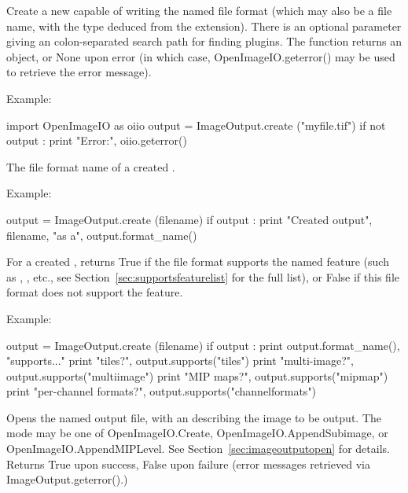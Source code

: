 
Create a new \ImageOutput capable of writing the named file format (which may
also be a file name, with the type deduced from the extension).  There
is an optional parameter giving an colon-separated search path for finding
\ImageOutput plugins.  The function returns an \ImageOutput object, or
{\cf None} upon error (in which case, {OpenImageIO.geterror()} may be used
to retrieve the error message).

\noindent Example:
\begin{code}
    import OpenImageIO as oiio
    output = ImageOutput.create ("myfile.tif")
    if not output :
        print "Error:", oiio.geterror()
\end{code}
\apiend

The file format name of a created \ImageOutput.

\noindent Example:
\begin{code}
    output = ImageOutput.create (filename)
    if output :
        print "Created output", filename, "as a", output.format_name()
\end{code}
\apiend

For a created \ImageOutput, returns {\cf True} if the file format supports
the named feature (such as , , etc., see
Section~\ref{sec:supportsfeaturelist} for the full list), or {\cf False}
if this file format does not support the feature.

\noindent Example:
\begin{code}
    output = ImageOutput.create (filename)
    if output :
        print output.format_name(), "supports..."
        print "tiles?", output.supports("tiles")
        print "multi-image?", output.supports("multiimage")
        print "MIP maps?", output.supports("mipmap")
        print "per-channel formats?", output.supports("channelformats")
\end{code}
\apiend

Opens the named output file, with an \ImageSpec describing the image to
be output.  The {\cf mode} may be one of {\cf OpenImageIO.Create},
{\cf OpenImageIO.AppendSubimage}, or {\cf OpenImageIO.AppendMIPLevel}.
See Section~\ref{sec:imageoutputopen} for details.  Returns {\cf True}
upon success, {\cf False} upon failure (error messages retrieved via
{\cf ImageOutput.geterror()}.)

